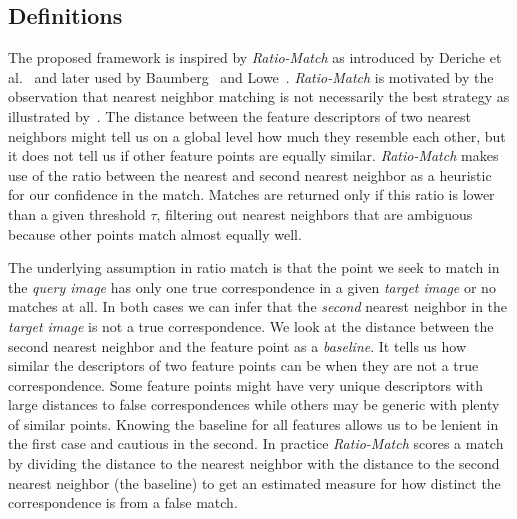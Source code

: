 \documentclass[review]{elsarticle}
\begin{document}
\subsection{Definitions}
%
The proposed framework is inspired by \emph{Ratio-Match} as introduced by Deriche et al.\ \cite{deriche1994robust} and later used by Baumberg~\cite{baumberg2000reliable} and Lowe~\cite{lowe2004sift}. \emph{Ratio-Match} is motivated by the observation that nearest neighbor matching is not necessarily the best strategy as illustrated by~\cite{lowe2004sift, mikolajczyk2005performance}. The distance between the feature descriptors of two nearest neighbors might tell us on a global level how much they resemble each other, but it does not tell us if other feature points are equally similar. \emph{Ratio-Match} makes use of the ratio between the nearest and second nearest neighbor as a heuristic for our confidence in the match. Matches are returned only if this ratio is lower than a given threshold $\tau$, filtering out nearest neighbors that are ambiguous because other points match almost equally well.

The underlying assumption in ratio match is that the point we seek to match in the \emph{query image} has only one true correspondence in a given \emph{target image} or no matches at all. In both cases we can infer that the \emph{second} nearest neighbor in the \emph{target image} is not a true correspondence. We look at the distance between the second nearest neighbor and the feature point as a \emph{baseline}. It tells us how similar the descriptors of two feature points can be when they are not a true correspondence. Some feature points might have very unique descriptors with large distances to false correspondences while others may be generic with plenty of similar points. Knowing the baseline for all features allows us to be lenient in the first case and cautious in the second. In practice \emph{Ratio-Match} scores a match by dividing the distance to the nearest neighbor with the distance to the second nearest neighbor (the baseline) to get an estimated measure for how distinct the correspondence is from a false match.  
\end{document}
